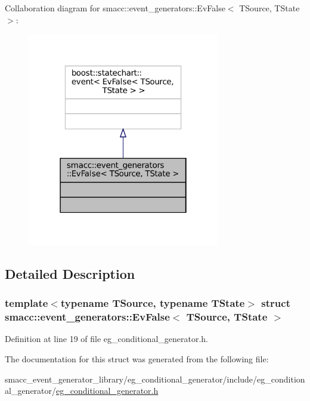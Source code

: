 Collaboration diagram for smacc\+:\+:event\+\_\+generators\+:\+:Ev\+False$<$ T\+Source, T\+State $>$\+:
\nopagebreak
\begin{figure}[H]
\begin{center}
\leavevmode
\includegraphics[width=238pt]{structsmacc_1_1event__generators_1_1EvFalse__coll__graph}
\end{center}
\end{figure}


\subsection{Detailed Description}
\subsubsection*{template$<$typename T\+Source, typename T\+State$>$\newline
struct smacc\+::event\+\_\+generators\+::\+Ev\+False$<$ T\+Source, T\+State $>$}



Definition at line 19 of file eg\+\_\+conditional\+\_\+generator.\+h.



The documentation for this struct was generated from the following file\+:\begin{DoxyCompactItemize}
\item 
smacc\+\_\+event\+\_\+generator\+\_\+library/eg\+\_\+conditional\+\_\+generator/include/eg\+\_\+conditional\+\_\+generator/\hyperlink{eg__conditional__generator_8h}{eg\+\_\+conditional\+\_\+generator.\+h}\end{DoxyCompactItemize}
